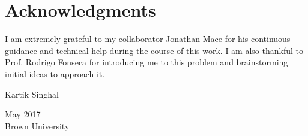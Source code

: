 \cleardoublepage
{}
{}
\chapter*{Acknowledgments}
\vspace{0.5in}
I am extremely grateful to my collaborator Jonathan Mace for his continuous guidance and technical help during the course of this work. I am also thankful to Prof. Rodrigo Fonseca for introducing me to this problem and brainstorming initial ideas to approach it.
\vspace{0.5in}

Kartik Singhal
\vspace{0.2in}

May 2017\\
Brown University

\newpage
